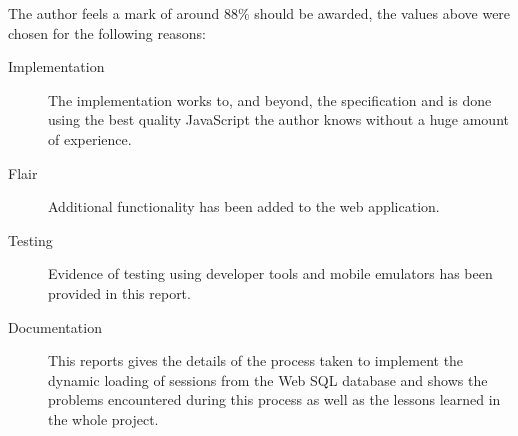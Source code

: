 \documentclass[10pt, a4paper]{article}
\begin{document}
The author feels a mark of around 88\% should be awarded, the values above were
chosen for the following reasons:

\begin{description}
\item[Implementation] The implementation works to, and beyond, the
specification and is done using the best quality JavaScript the author knows
without a huge amount of experience.
\item[Flair] Additional functionality has been added to the web application.
\item[Testing] Evidence of testing using developer tools and mobile emulators
has been provided in this report.
\item[Documentation] This reports gives the details of the process taken to
implement the dynamic loading of sessions from the Web SQL database and shows
the problems encountered during this process as well as the lessons learned in
the whole project.
\end{description}


\newpage


\end{document}
